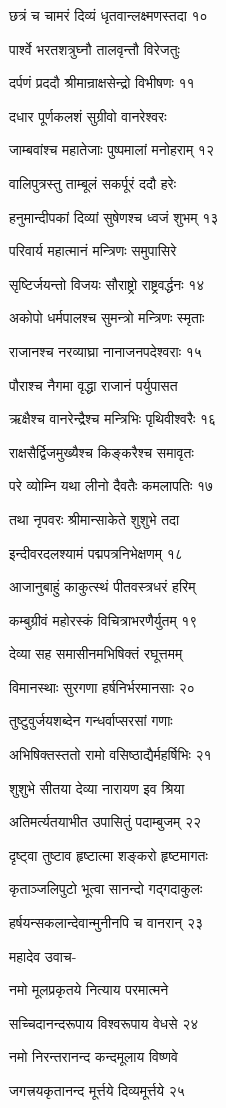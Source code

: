 छत्रं च चामरं दिव्यं धृतवान्लक्ष्मणस्तदा १०

पार्श्वे भरतशत्रुघ्नौ तालवृन्तौ विरेजतुः

दर्पणं प्रददौ श्रीमान्राक्षसेन्द्रो विभीषणः ११

दधार पूर्णकलशं सुग्रीवो वानरेश्वरः

जाम्बवांश्च महातेजाः पुष्पमालां मनोहराम् १२

वालिपुत्रस्तु ताम्बूलं सकर्पूरं ददौ हरेः

हनुमान्दीपकां दिव्यां सुषेणश्च ध्वजं शुभम् १३

परिवार्य महात्मानं मन्त्रिणः समुपासिरे

सृष्टिर्जयन्तो विजयः सौराष्ट्रो राष्ट्रवर्द्धनः १४

अकोपो धर्मपालश्च सुमन्त्रो मन्त्रिणः स्मृताः

राजानश्च नरव्याघ्रा नानाजनपदेश्वराः १५

पौराश्च नैगमा वृद्धा राजानं पर्युपासत

ऋक्षैश्च वानरेन्द्रैश्च मन्त्रिभिः पृथिवीश्वरैः १६

राक्षसैर्द्विजमुख्यैश्च किङ्करैश्च समावृतः

परे व्योम्नि यथा लीनो दैवतैः कमलापतिः १७

तथा नृपवरः श्रीमान्साकेते शुशुभे तदा

इन्दीवरदलश्यामं पद्मपत्रनिभेक्षणम् १८

आजानुबाहुं काकुत्स्थं पीतवस्त्रधरं हरिम्

कम्बुग्रीवं महोरस्कं विचित्राभरणैर्युतम् १९

देव्या सह समासीनमभिषिक्तं रघूत्तमम्

विमानस्थाः सुरगणा हर्षनिर्भरमानसाः २०

तुष्टुवुर्जयशब्देन गन्धर्वाप्सरसां गणाः

अभिषिक्तस्ततो रामो वसिष्ठाद्यैर्महर्षिभिः २१

शुशुभे सीतया देव्या नारायण इव श्रिया

अतिमर्त्यतयाभीत उपासितुं पदाम्बुजम् २२

दृष्ट्वा तुष्टाव हृष्टात्मा शङ्करो हृष्टमागतः

कृताञ्जलिपुटो भूत्वा सानन्दो गद्गदाकुलः

हर्षयन्सकलान्देवान्मुनीनपि च वानरान् २३

महादेव उवाच-

नमो मूलप्रकृतये नित्याय परमात्मने

सच्चिदानन्दरूपाय विश्वरूपाय वेधसे २४

नमो निरन्तरानन्द कन्दमूलाय विष्णवे

जगत्त्रयकृतानन्द मूर्त्तये दिव्यमूर्त्तये २५


